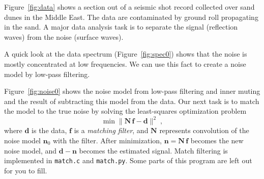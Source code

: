 Figure~\ref{fig:data} shows a section out of a seismic shot record
collected over sand dunes in the Middle East. The data are
contaminated by ground roll propagating in the sand. A major data
analysis task is to separate the signal (reflection waves) from the
noise (surface waves).


A quick look at the data spectrum (Figure~\ref{fig:spec0}) shows that the
noise is mostly concentrated at low frequencies. We can use this fact
to create a noise model by low-pass filtering.


Figure~\ref{fig:noise0} shows the noise model from low-pass filtering
and inner muting and the result of subtracting this model from the
data. Our next task is to match the model to the true noise by solving
the least-squares optimization problem
\begin{equation}
\label{eq:ls}
\min \|\mathbf{N}\,\mathbf{f} - \mathbf{d}\|^2\;,
\end{equation}
where $\mathbf{d}$ is the data, $\mathbf{f}$ is a \emph{matching filter}, and
$\mathbf{N}$ represents convolution of the noise model
$\mathbf{n}_0$ with the filter. After minimization, $\mathbf{n} =
\mathbf{N}\,\mathbf{f}$ becomes the new noise model, and
$\mathbf{d}-\mathbf{n}$ becomes the estimated signal. Match filtering
is implemented in \texttt{match.c} and \texttt{match.py}. Some parts of this program
are left out for you to fill.

\lstset{language=c,numbers=left,numberstyle=\tiny,showstringspaces=false}


\lstset{language=python,numbers=left,numberstyle=\tiny,showstringspaces=false}


